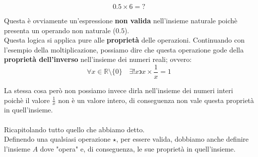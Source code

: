 \[ 0.5 \times 6 = ?\]

Questa è ovviamente un'espressione \textbf{non valida} nell'insieme naturale poichè presenta
un operando non naturale (\(0.5\)). \\
Questa logica si applica pure alle \textbf{proprietà} delle operazioni. Continuando con l'esempio
della moltiplicazione, possiamo dire che questa operazione gode della \textbf{proprietà dell'inverso}
nell'insieme dei numeri reali; ovvero:
\[
  \forall x \in \mathbb{R} \setminus \{0\} \quad
  \exists !x \backepsilon x \times \frac{1}{x} = 1
\]

La stessa cosa però non possiamo invece dirla nell'insieme dei numeri interi poichè il 
valore \(\frac{1}{x}\) non è un valore intero, di conseguenza non vale questa proprietà in quell'insieme. \\
\\
Ricapitolando tutto quello che abbiamo detto. \\
Definendo una qualsiasi operazione \(\star\), per essere valida, dobbiamo anche definire l'insieme 
\(A\) dove "opera" e, di conseguenza, le sue proprietà in quell'insieme.
